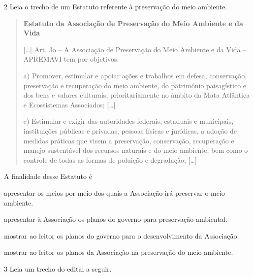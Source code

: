 \num{2} Leia o trecho de um Estatuto referente à preservação do meio
ambiente.

\begin{quote}
\textbf{Estatuto da Associação de Preservação do Meio Ambiente e da Vida}


{[}\ldots{}{]} Art. 3o -- A Associação de Preservação do Meio Ambiente e
da Vida -- APREMAVI tem por objetivos:

a) Promover, estimular e apoiar ações e trabalhos em defesa,
conservação, preservação e recuperação do meio ambiente, do patrimônio
paisagístico e dos bens e valores culturais, prioritariamente no âmbito
da Mata Atlântica e Ecossistemas Associados; {[}\ldots{}{]}

e) Estimular e exigir das autoridades federais, estaduais e municipais,
instituições públicas e privadas, pessoas físicas e jurídicas, a adoção
de medidas práticas que visem a preservação, conservação, recuperação e
manejo sustentável dos recursos naturais e do meio ambiente, bem como o
controle de todas as formas de poluição e degradação; {[}\ldots{}{]}

\end{quote}

A finalidade desse Estatuto é

\begin{escolha}
\item apresentar os meios por meio dos quais a Associação irá preservar o
meio ambiente.

\item apresentar à Associação os planos do governo para preservação
ambiental.

\item mostrar ao leitor os planos do governo para o desenvolvimento da
Associação.

\item mostrar ao leitor os planos da Associação na preservação do meio
ambiente.
\end{escolha}


\num{3} Leia um trecho do edital a seguir.

